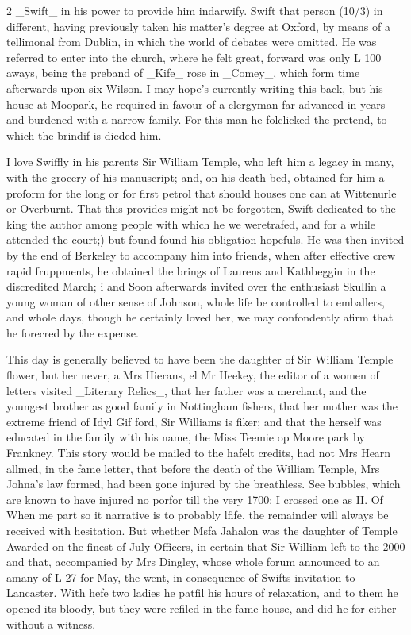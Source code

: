 \documentclass[10pt]{article}
\begin{document}
\begin{multicols}{2}\raggedcolumns
\_Swift\_ in his power to provide him indarwify. Swift that person (10/3) in different, having previously taken his matter’s degree at Oxford, by means of a tellimonal from Dublin, in which the world of debates were omitted. He was referred to enter into the church, where he felt great, forward was only L 100 aways, being the preband of \_Kife\_ rose in \_Comey\_, which form time afterwards upon six Wilson. I may hope’s currently writing this back, but his house at Moopark, he required in favour of a clergyman far advanced in years and burdened with a narrow family. For this man he folclicked the pretend, to which the brindif is dieded him.

I love Swiffly in his parents Sir William Temple, who left him a legacy in many, with the grocery of his manuscript; and, on his death-bed, obtained for him a proform for the long or for first petrol that should houses one can at Wittenurle or Overburnt. That this provides might not be forgotten, Swift dedicated to the king the author among people with which he we weretrafed, and for a while attended the court;) but found found his obligation hopefuls. He was then invited by the end of Berkeley to accompany him into friends, when after effective crew rapid fruppments, he obtained the brings of Laurens and Kathbeggin in the discredited March; i and Soon afterwards invited over the enthusiast Skullin a young woman of other sense of Johnson, whole life be controlled to emballers, and whole days, though he certainly loved her, we may confondently afirm that he forecred by the expense.

This day is generally believed to have been the daughter of Sir William Temple flower, but her never, a Mrs Hierans, el Mr Heekey, the editor of a women of letters visited \_Literary Relics\_, that her father was a merchant, and the youngest brother as good family in Nottingham fishers, that her mother was the extreme friend of Idyl Gif ford, Sir Williams is fiker; and that the herself was educated in the family with his name, the Miss Teemie op Moore park by Frankney. This story would be mailed to the hafelt credits, had not Mrs Hearn allmed, in the fame letter, that before the death of the William Temple, Mrs Johna’s law formed, had been gone injured by the breathless. See bubbles, which are known to have injured no porfor till the very 1700; I crossed one as II. Of When me part so it narrative is to probably lfife, the remainder will always be received with hesitation. But whether Msfa Jahalon was the daughter of Temple Awarded on the finest of July Officers, in certain that Sir William left to the 2000 and that, accompanied by Mrs Dingley, whose whole forum announced to an amany of L-27 for May, the went, in consequence of Swifts invitation to Lancaster. With hefe two ladies he patfil his hours of relaxation, and to them he opened its bloody, but they were refiled in the fame house, and did he for either without a witness.


\end{multicols}
\end{document}
